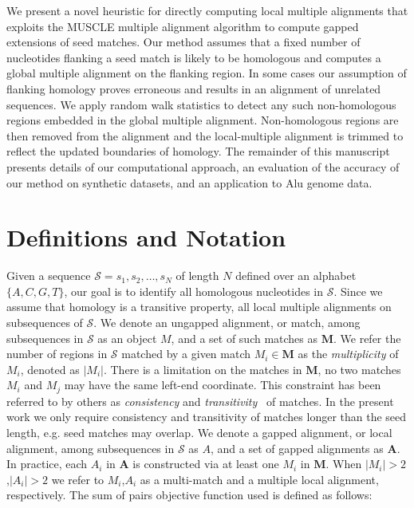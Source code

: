\documentclass[twoside,11pt]{article}
\begin{document}
We present a novel heuristic for directly computing local multiple alignments that exploits the MUSCLE multiple alignment algorithm to compute gapped extensions of seed matches.  Our method assumes that a fixed number of nucleotides flanking a seed match is likely to be homologous and computes a global multiple alignment on the flanking region.  In some cases our assumption of flanking homology proves erroneous and results in an alignment of unrelated sequences.  We apply random walk statistics to detect any such non-homologous regions embedded in the global multiple alignment.  Non-homologous regions are then removed from the alignment and the local-multiple alignment is trimmed to reflect the updated boundaries of homology.  The remainder of this manuscript presents details of our computational approach, an evaluation of the accuracy of our method on synthetic datasets, and an application to Alu genome data.



\label{sec:overview}
\section{Definitions and Notation}

Given a sequence $\mathcal{S}=s_1, s_2,\dots, s_N$ of length $N$
defined over an alphabet $\{A,C,G,T\}$, our goal is to identify all homologous nucleotides in $\mathcal{S}$.
Since we assume that homology is a transitive property, all
local multiple alignments on subsequences of $\mathcal{S}$. We denote
an ungapped alignment, or match, among subsequences in $\mathcal{S}$
as an object $M$, and a set of such matches as $\mathbf{M}$.
We refer the number of regions in $\mathcal{S}$
matched by a given match $M_i \in \mathbf{M}$ as the
\textit{multiplicity} of $M_i$, denoted as $|M_i|$. There is a limitation on the matches in
$\mathbf{M}$, no two matches $M_i$ and $M_j$ may have the same
left-end coordinate.  This constraint has been referred to by others as \textit{consistency} and
\textit{transitivity}~\cite{ref-transitivity} of matches.  In the
present work we only require consistency and transitivity of matches
longer than the seed length, e.g. seed matches may overlap. We denote a gapped alignment, or local alignment, among subsequences in $\mathcal{S}$ as $A$, and a set of gapped alignments as $\mathbf{A}$.  In practice, each $A_i$ in $\mathbf{A}$ is constructed via
at least one $M_i$ in $\mathbf{M}$. When $|M_i|>2$,$|A_i|>2$ we refer to $M_i$,$A_i$ as
a multi-match and a multiple local alignment, respectively. The sum of pairs objective function used is defined as follows:\\
\end{document}
